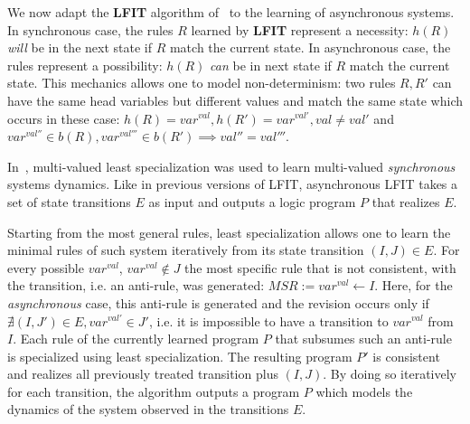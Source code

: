 We now adapt the {\bf LFIT} algorithm of~\cite{ribeiro2015learning} to the learning of asynchronous systems.
In synchronous case, the rules $R$ learned by {\bf LFIT} represent a necessity: $h(R)$ \textit{will} be in the next state if $R$ match the current state.
In asynchronous case, the rules represent a possibility: $h(R)$ \textit{can} be in next state if $R$ match the current state.
This mechanics allows one to model non-determinism: two rules $R, R'$ can have the same head variables but different values and match the same state which occurs in these case:
$h(R)=var^{val}, h(R')=var^{val'}, val \neq val'$ and $var^{val''} \in b(R), var^{val'''}\in b(R') \implies val'' = val'''$.

In~\cite{DMTRICLP15}, multi-valued least specialization was used to learn multi-valued \textit{synchronous} systems dynamics.
Like in previous versions of LFIT, asynchronous LFIT takes a set of state transitions $E$ as input and outputs a logic program $P$ that realizes $E$.

Starting from the most general rules, least specialization allows one to learn the minimal rules of such system iteratively from its state transition $(I,J) \in E$.
For every possible $var^{val}$, $var^{val} \not \in J$ the most specific rule that is not consistent, with the transition, i.e. an anti-rule, was generated: $MSR := var^{val} \leftarrow I$.
Here, for the \textit{asynchronous} case, this anti-rule is generated and the revision occurs only if $\nexists (I,J') \in E, var^{val'} \in J'$,
i.e. it is impossible to have a transition to $var^{val}$ from $I$.
Each rule of the currently learned program $P$ that subsumes such an anti-rule is specialized using least specialization.
The resulting program $P'$ is consistent and realizes all previously treated transition plus $(I,J)$.
By doing so iteratively for each transition, the algorithm outputs a program $P$ which models the dynamics of the system observed in the transitions $E$.

